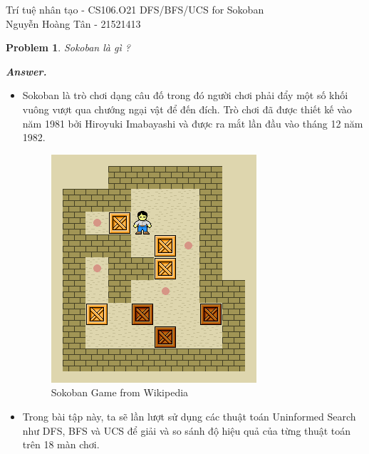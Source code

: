 \documentclass[12pt]{article}
\newtheorem{problem}{Problem}
\newenvironment{solution}[1][\it{Answer}]{\textbf{#1. } }{}
\begin{document}
\graphicspath{ {Figs/} } 

\noindent Trí tuệ nhân tạo - CS106.O21 \hfill DFS/BFS/UCS for Sokoban \\
Nguyễn Hoàng Tân - 21521413

\hrulefill


\begin{problem}
	Sokoban là gì ?
\end{problem}
\begin{solution}
	\begin{itemize}
		\item Sokoban là trò chơi dạng câu đố trong đó người chơi phải
		đẩy một số khối vuông vượt qua chướng ngại vật để đến đích. Trò chơi đã
		được thiết kế vào năm 1981 bởi Hiroyuki Imabayashi và được ra mắt lần
		đầu vào tháng 12 năm 1982.
		\begin{figure}[h]
			\centering
			\includegraphics[scale=0.5]{frame_17_delay-0.2s.png}
			\caption{Sokoban Game from Wikipedia}
		
		\end{figure}
		\item Trong bài tập này, ta sẽ lần lượt sử dụng các thuật toán Uninformed
		Search như DFS, BFS và UCS để giải và so sánh độ hiệu quả của từng thuật toán trên 18 màn chơi.
	\end{itemize}
\end{solution} 
\end{document}
